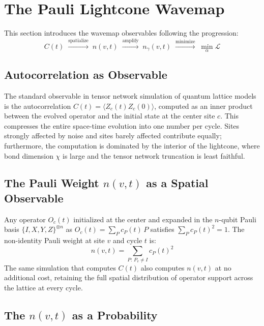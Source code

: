 \documentclass[letterpaper]{article}
\begin{document}
\section{The Pauli Lightcone Wavemap}
\label{sec:wavemap}
This section introduces the wavemap observables following the progression:
\begin{equation}
  C(t) \;\xrightarrow{\text{spatialize}}\; n(v,t)
       \;\xrightarrow{\text{amplify}}\; n_\gamma(v,t)
       \;\xrightarrow{\text{minimize}}\; \min_\alpha \mathcal{L}
  \label{eq:progression}
\end{equation}
\subsection{Autocorrelation as Observable}

The standard observable in tensor network simulation of quantum lattice
models is the autocorrelation $C(t) = \langle Z_c(t) Z_c(0)\rangle$,
computed as an inner product between the evolved operator and the
initial state at the center site $c$.
This compresses the entire space-time evolution into one number per cycle.
Sites strongly affected by noise and sites barely affected contribute
equally; furthermore, the computation is dominated by the interior of
the lightcone, where bond dimension $\chi$ is large and the tensor
network truncation is least faithful.

\subsection{The Pauli Weight $n(v,t)$ as a Spatial Observable}

Any operator $O_c(t)$ initialized at the center and expanded in the
$n$-qubit Pauli basis $\{I,X,Y,Z\}^{\otimes n}$ as
$O_c(t) = \sum_P c_P(t)\,P$ satisfies $\sum_P c_P(t)^2 = 1$.
The non-identity Pauli weight at site $v$ and cycle $t$ is:
\begin{equation}
    n(v,t) = \sum_{P:\,P_v \neq I} c_P(t)^2
    \label{eq:nvt}
\end{equation}
The same simulation that computes $C(t)$ also computes $n(v,t)$ at no
additional cost, retaining the full spatial distribution of operator
support across the lattice at every cycle.


\subsection{The $n(v,t)$ as a Probability}
\end{document}
